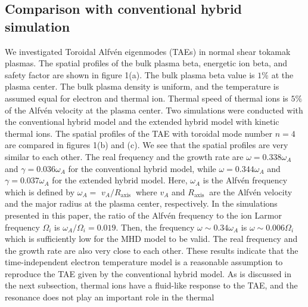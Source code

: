 \documentclass[10pt]{article}
\begin{document}
\subsection{Comparison with conventional hybrid simulation}
We investigated Toroidal Alfvén eigenmodes (TAEs) in normal shear tokamak plasmas. The spatial profiles of the bulk plasma beta, energetic ion beta, and safety factor are shown in figure 1(a). The bulk plasma beta value is $1 \%$ at the plasma center. The bulk plasma density is uniform, and the temperature is assumed equal for electron and thermal ion. Thermal speed of thermal ions is $5 \%$ of the Alfvén velocity at the plasma center. Two simulations were conducted with the conventional hybrid model and the extended hybrid model with kinetic thermal ions. The spatial profiles of the TAE with toroidal mode number $n=4$ are compared in figures 1(b) and (c). We see that the spatial profiles are very similar to each other. The real frequency and the growth rate are $\omega=0.338 \omega_{A}$ and $\gamma=0.036 \omega_{A}$ for the conventional hybrid model, while $\omega=0.344 \omega_{A}$ and $\gamma=0.037 \omega_{A}$ for the extended hybrid model. Here, $\omega_{A}$ is the Alfvén frequency which is defined by $\omega_{A}=$ $v_{A} / R_{\text {axis }}$ where $v_{A}$ and $R_{\text {axis }}$ are the Alfvén velocity and the major radius at the plasma center, respectively. In the simulations presented in this paper, the ratio of the Alfvén frequency to the ion Larmor frequency $\Omega_{i}$ is $\omega_{A} / \Omega_{i}=0.019$. Then, the frequency $\omega \sim 0.34 \omega_{A}$ is $\omega \sim 0.006 \Omega_{i}$ which is sufficiently low for the MHD model to be valid. The real frequency and the growth rate are also very close to each other. These results indicate that the time-independent electron temperature model is a reasonable assumption to reproduce the TAE given by the conventional hybrid model. As is discussed in the next subsection, thermal ions have a fluid-like response to the TAE, and the resonance does not play an important role in the thermal
\end{document}
